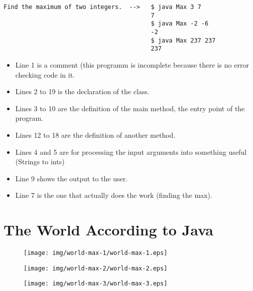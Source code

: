 \documentclass[8pt, a4paper, oneside]{extarticle}
\begin{document}
\begin{Verbatim}
Find the maximum of two integers.  -->   $ java Max 3 7
                                         7
                                         $ java Max -2 -6
                                         -2
                                         $ java Max 237 237
                                         237
\end{Verbatim}
\newpage
\begin{multicols}{2}
\columnbreak

\begin{itemize}

  \item Line 1 is a comment (this programm is incomplete because there is no
    error checking code in it.

  \item Lines 2 to 19 is the declaration of the class.

  \item Lines 3 to 10 are the definition of the main method, the entry point of
    the program.

  \item Lines 12 to 18 are the definition of another method.

  \item Lines 4 and 5 are for processing the input arguments into something
    useful (Strings to ints)

  \item Line 9 shows the output to the user.

  \item Line 7 is the one that actually does the work (finding the max).

\end{itemize}

\end{multicols}

\section{The World According to Java}

\begin{figure}[!ht]
  \centering
  \texttt{[image: img/world-max-1/world-max-1.eps]}
\end{figure}
\begin{figure}[!ht]
  \centering
  \begin{minipage}{.5\textwidth}
    \centering
    \texttt{[image: img/world-max-2/world-max-2.eps]}
  \end{minipage}%
  \begin{minipage}{.5\textwidth}
    \centering
    \texttt{[image: img/world-max-3/world-max-3.eps]}
  \end{minipage}
\end{figure}
\end{document}
